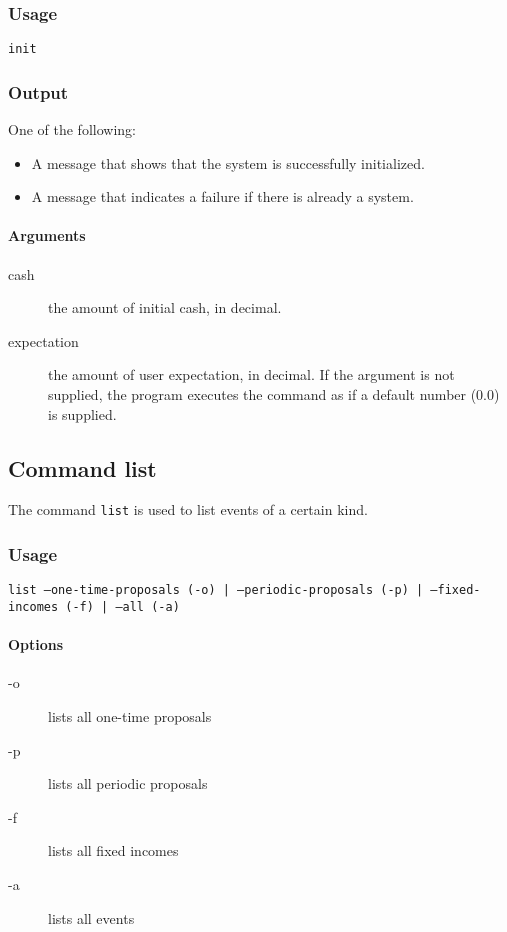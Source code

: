 \subsubsection{Usage}
\begin{center}
	\texttt{init}  
\end{center}

\subsubsection{Output}
One of the following:
\begin{itemize}
	\item A message that shows that the system is successfully initialized.
	\item A message that indicates a failure if there is already a system.
\end{itemize}

\paragraph{Arguments}
\begin{description}
	\item[cash] the amount of initial cash, in decimal.
	\item[expectation] the amount of user expectation, in decimal. If the argument is not supplied, the program executes the command as if a default number (0.0) is supplied.
\end{description}

\subsection{Command list}
The command \texttt{list} is used to list events of a certain kind.

\subsubsection{Usage}
\begin{center}
	\texttt{list  --one-time-proposals (-o) | --periodic-proposals (-p) | --fixed-incomes (-f) | --all (-a)}
\end{center}

\paragraph{Options}
\begin{description}
	\item[-o] lists all one-time proposals
	\item[-p] lists all periodic proposals
	\item[-f] lists all fixed incomes
	\item[-a] lists all events
\end{description}

